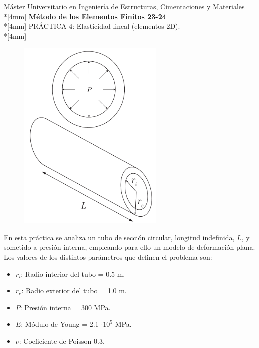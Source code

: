 \documentclass[a4paper,12pt]{article}
\begin{document}
\def\bm#1{{\mbox{\boldmath $#1$}}}
\def\eqdef{\buildrel \rm def \over =}
\def\signo{\mathop{\rm signo}\nolimits}

\mbox{}\vspace*{-20mm}

{\centering
{\small\sc %
Máster Universitario en Ingeniería de Estructuras, Cimentaciones y Materiales}\\*[4mm]
{\Large\bf Método de los Elementos Finitos 23-24}\\*[4mm]
PRÁCTICA 4: Elasticidad lineal (elementos 2D). \\*[4mm]}


\begin{figure}
\includegraphics[width=70mm]{cargas}
\end{figure}

En esta práctica se analiza un tubo de sección circular, longitud indefinida, $L$, y sometido a presión interna, empleando para ello un modelo de deformación plana.\\

Los valores de los distintos parámetros que definen el problema son:

\begin{itemize}
\item  \texttt {$r_i$}: Radio interior del tubo = 0.5 m.
\item \texttt {$r_e$}: Radio exterior del tubo = 1.0 m.
\item \texttt {$P$}: Presión interna = 300 MPa.
\item \texttt {$E$}: Módulo de Young = 2.1 $\cdot10^5$ MPa.
\item \texttt {$\nu$}: Coeficiente de Poisson 0.3.
\end{itemize}
\end{document}
